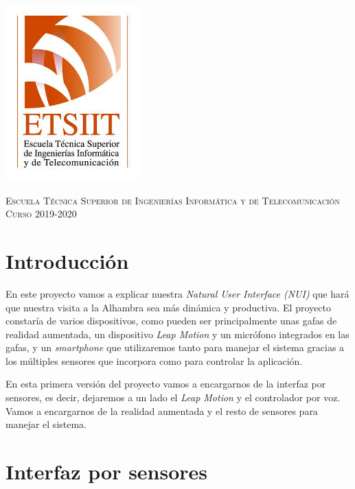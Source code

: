 \documentclass[11pt,a4paper]{article}
\begin{document}
\begin{titlepage}
\begin{minipage}{\textwidth}
\includegraphics[scale=0.3]{img/etsiit.jpeg}

\vspace{0.5cm}
\textsc{Escuela Técnica Superior de Ingenierías Informática y de Telecomunicación}\\
\vspace{0.5cm}
\textsc{Curso 2019-2020}
\end{minipage}
\end{titlepage}

\tableofcontents
\thispagestyle{empty}				%

\newpage

\setlength{\parskip}{1em}


\section{Introducción}
En este proyecto vamos a explicar nuestra \textit{Natural User Interface (NUI)} que hará que nuestra visita a la Alhambra sea más
dinámica y productiva. El proyecto constaría de varios dispositivos, como pueden ser principalmente unas gafas de realidad aumentada,
un dispositivo \textit{Leap Motion} y un micrófono integrados en las gafas, y un \textit{smartphone} que utilizaremos tanto para
manejar el sistema gracias a los múltiples sensores que incorpora como para controlar la aplicación.

En esta primera versión del proyecto vamos a encargarnos de la interfaz por sensores, es decir, dejaremos a un lado el \textit{Leap Motion}
y el controlador por voz. Vamos a encargarnos de la realidad aumentada y el resto de sensores para manejar el sistema.

\section{Interfaz por sensores}
\end{document}

